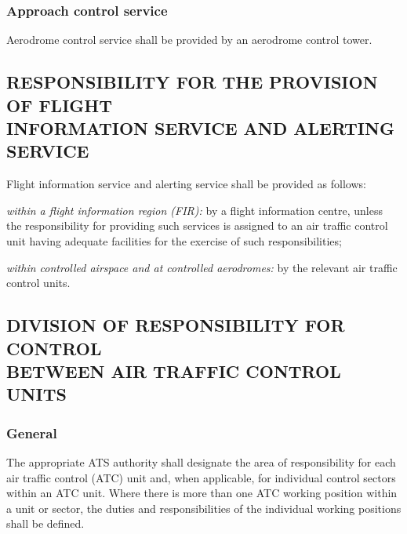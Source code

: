 
\subsubsection{Approach control service}

Aerodrome control service shall be provided by an aerodrome control tower.

\subsection[Responsibility for the provision of flight information service and alerting service]{RESPONSIBILITY FOR THE PROVISION OF FLIGHT \\ INFORMATION SERVICE AND ALERTING SERVICE}

Flight information service and alerting service shall be provided as follows:
\begin{enumalph}
    \item \textit{within a flight information region (FIR):} by a flight information centre, unless the responsibility for providing such services is assigned to an air traffic control unit having adequate facilities for the exercise of such responsibilities;
    \item \textit{within controlled airspace and at controlled aerodromes:} by the relevant air traffic control units.
\end{enumalph}

\subsection[Division of responsibility for control between air traffic control units]{DIVISION OF RESPONSIBILITY FOR CONTROL \\ BETWEEN AIR TRAFFIC CONTROL UNITS}

\subsubsection{General}

The appropriate ATS authority shall designate the area of responsibility for each air traffic control (ATC) unit and, when applicable, for individual control sectors within an ATC unit. Where there is more than one ATC working position within a unit or sector, the duties and responsibilities of the individual working positions shall be defined.

